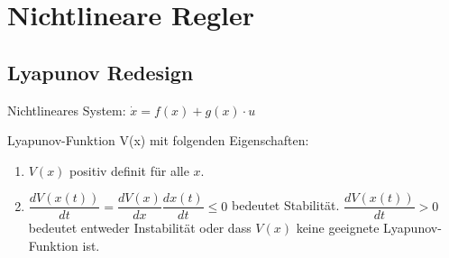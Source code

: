 \section{Nichtlineare Regler}

\subsection{Lyapunov Redesign}

Nichtlineares System: $\dot{x} = f(x) + g(x) \cdot u$

Lyapunov-Funktion V(x) mit folgenden Eigenschaften:
\begin{enumerate}
	\item $V(x)$ positiv definit für alle $x$.
	\item $\dfrac{dV(x(t))}{dt}=\dfrac{dV(x)}{dx}\dfrac{dx(t)}{dt} \leq 0$ bedeutet Stabilität. $\dfrac{dV(x(t))}{dt} > 0$ bedeutet entweder Instabilität oder dass $V(x)$ keine geeignete Lyapunov-Funktion ist.
\end{enumerate}